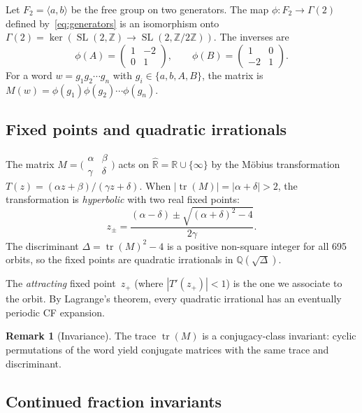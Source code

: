 \documentclass[11pt]{article}
\theoremstyle{definition}
\newtheorem{remark}[theorem]{Remark}
\newcommand{\Z}{\mathbb{Z}}
\newcommand{\Q}{\mathbb{Q}}
\newcommand{\R}{\mathbb{R}}
\DeclareMathOperator{\tr}{tr}
\DeclareMathOperator{\SL}{SL}
\begin{document}
Let $F_2 = \langle a, b \rangle$ be the free group on two
generators. The map $\phi: F_2 \to \Gamma(2)$ defined
by~\eqref{eq:generators} is an isomorphism onto
$\Gamma(2) = \ker(\SL(2,\Z) \to \SL(2,\Z/2\Z))$.
The inverses are
\[
\phi(A) = \begin{pmatrix} 1 & -2 \\ 0 & 1 \end{pmatrix}, \qquad
\phi(B) = \begin{pmatrix} 1 & 0 \\ -2 & 1 \end{pmatrix}.
\]
For a word $w = g_1 g_2 \cdots g_n$ with $g_i \in \{a, b, A, B\}$,
the matrix is $M(w) = \phi(g_1)\phi(g_2) \cdots \phi(g_n)$.

\subsection{Fixed points and quadratic irrationals}

The matrix $M = \bigl(\begin{smallmatrix} \alpha & \beta \\
\gamma & \delta \end{smallmatrix}\bigr)$ acts on
$\hat{\R} = \R \cup \{\infty\}$ by the M\"obius transformation
$T(z) = (\alpha z + \beta)/(\gamma z + \delta)$. When
$|\tr(M)| = |\alpha + \delta| > 2$, the transformation is
\emph{hyperbolic} with two real fixed points:
\begin{equation}\label{eq:fixed-points}
z_{\pm} = \frac{(\alpha - \delta) \pm
\sqrt{(\alpha + \delta)^2 - 4}}{2\gamma}.
\end{equation}
The discriminant $\Delta = \tr(M)^2 - 4$ is a positive non-square
integer for all 695 orbits, so the fixed points are quadratic
irrationals in $\Q(\sqrt{\Delta})$.

The \emph{attracting} fixed point~$z_+$ (where $|T'(z_+)| < 1$) is
the one we associate to the orbit. By Lagrange's theorem, every
quadratic irrational has an eventually periodic CF expansion.

\begin{remark}[Invariance]
The trace $\tr(M)$ is a conjugacy-class invariant: cyclic
permutations of the word yield conjugate matrices with the same
trace and discriminant.
\end{remark}

\subsection{Continued fraction invariants}
\end{document}

